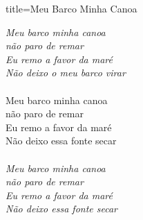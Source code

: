\documentclass[fontsize=14pt, paper=a4, twoside, DIV=20]{scrreprt} %
\begin{document}
\begin{multicols*}{2}
\begin{song}{title={Meu Barco Minha Canoa}}
\begin{verse*}
            \textit{Meu barco minha canoa }\\
            \textit{não paro de remar}\\
            \textit{Eu remo a favor da maré}\\
            \textit{Não deixo o meu barco virar}\\
            \\
            Meu barco minha canoa\\
            não paro de remar\\
            Eu remo a favor da maré\\
            Não deixo essa fonte secar\\
            \\
            \textit{Meu barco minha canoa }\\
            \textit{não paro de remar}\\
            \textit{Eu remo a favor da maré}\\
            \textit{Não deixo essa fonte secar}\\


\end{verse*}
\end{song}
\end{multicols*}
\end{document}
